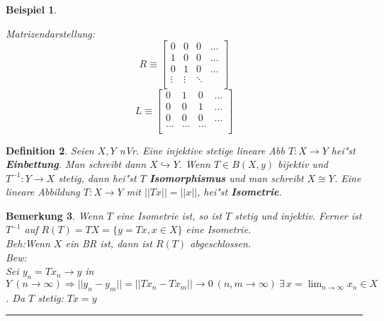 \documentclass[a4paper,11pt]{book}
\newcommand{\begriff}[1]{\textbf{#1}} %
\newcommand{\eb}{\begin{flushright} \rule{1ex}{1ex} \end{flushright}}
\newtheorem{Def}{Definition}[chapter]
\newtheorem{Bsp}[Def]{Beispiel}
\newtheorem{Bem}[Def]{Bemerkung}
\theoremstyle{nonumberplain}
\begin{document}
\begin{Bsp}
\begin{enumerate}
Matrizendarstellung:
\[
R \equiv \left[ \begin{array}{cccc}
0 & 0 & 0 & \ldots \\
1 & 0 & 0 & \ldots \\
0 & 1 & 0 & \ldots \\
\vdots & \vdots & \ddots & \\
\end{array} \right]
\]
\[
L \equiv \left[ \begin{array}{cccc}
0 & 1 & 0 & \dots \\
0 & 0 & 1 & \dots \\
0 & 0 & 0 & \dots \\
\hdots & \hdots & \hdots & \\
\end{array} \right]
\]
\end{enumerate}
\end{Bsp}

\begin{Def}
Seien $X,Y$ nVr. Eine injektive stetige lineare Abb $T: X \rightarrow Y$ hei"st \begriff{Einbettung}. Man schreibt dann $X \hookrightarrow Y$. Wenn $T \in B(X,y)$ bijektiv und $T^{-1}: Y \rightarrow X$ stetig, dann hei"st $T$ \begriff{Isomorphismus} und man schreibt $X \cong Y$. Eine lineare Abbildung $T: X \rightarrow Y$ mit $||Tx|| = ||x||$, hei"st \begriff{Isometrie}.
\end{Def}

\begin{Bem}
Wenn $T$ eine Isometrie ist, so ist $T$ stetig und injektiv. Ferner ist $T^{-1}$ auf $R(T) = TX = \{ y = Tx, x \in X \}$ eine Isometrie.\\
\emph{Beh:}Wenn $X$ ein BR ist, dann ist $R(T)$ abgeschlossen.\\
\emph{Bew:}\\
Sei $y_n = Tx_n \rightarrow y$ in $Y \ (n \rightarrow \infty) \Rightarrow ||y_n - y_m|| = ||Tx_n - Tx_m|| \rightarrow 0 \ (n,m \rightarrow \infty) \ \exists\, x = \lim_{n \rightarrow \infty} x_n \in X$. Da $T$ stetig: $Tx = y$ \eb
\end{Bem}
\end{document}
